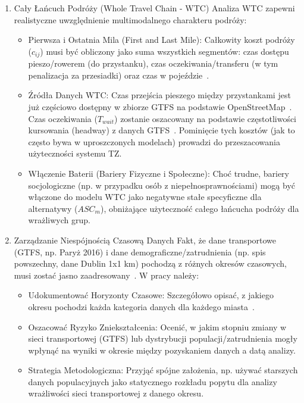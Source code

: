 \documentclass[12pt]{article}
\begin{document}
\begin{enumerate}
\begin{itemize}
        \item Współczynnik Impedancji oparty o Zamożność ($\beta$): W celu uwzględnienia sprawiedliwości społecznej (Society Mapping), współczynnik zaniku ($\beta$), określający wrażliwość na czas podróży, musi być kalibrowany w oparciu o różnice w zamożności (dochody). Wysoki dochód często koreluje z wyższą wrażliwością na czas (wyższe $\beta$), co wymaga segmentacji demograficznej modelu.
    \end{itemize}
    \item Cały Łańcuch Podróży (Whole Travel Chain - WTC) \newline
    Analiza WTC zapewni realistyczne uwzględnienie multimodalnego charakteru podróży:
    \begin{itemize}
        \item Pierwsza i Ostatnia Mila (First and Last Mile): Całkowity koszt podróży ($c_{ij}$) musi być obliczony jako suma wszystkich segmentów: czas dostępu pieszo/rowerem (do przystanku), czas oczekiwania/transferu (w tym penalizacja za przesiadki) oraz czas w pojeździe~\cite{dziewiec}.
        \item Źródła Danych WTC: Czas przejścia pieszego między przystankami jest już częściowo dostępny w zbiorze GTFS na podstawie OpenStreetMap~\cite{trzydziescipiec}. Czas oczekiwania ($T_{wait}$) zostanie oszacowany na podstawie częstotliwości kursowania (headway) z danych GTFS~\cite{dwadziesciatrzy, szescdziesiatcztery}. Pominięcie tych kosztów (jak to często bywa w uproszczonych modelach) prowadzi do przeszacowania użyteczności systemu TZ.
        \item Włączenie Baterii (Bariery Fizyczne i Społeczne): Choć trudne, bariery socjologiczne (np. w przypadku osób z niepełnosprawnościami) mogą być włączone do modelu WTC jako negatywne stałe specyficzne dla alternatywy ($ASC_m$), obniżające użyteczność całego łańcucha podróży dla wrażliwych grup.
    \end{itemize}
    \item Zarządzanie Niespójnością Czasową Danych \newline
    Fakt, że dane transportowe (GTFS, np. Paryż 2016) i dane demograficzne/zatrudnienia (np. spis powszechny, dane Dublin 1x1 km) pochodzą z różnych okresów czasowych, musi zostać jasno zaadresowany~\cite{dwanascie}. W pracy należy:
    \begin{itemize}
        \item Udokumentować Horyzonty Czasowe: Szczegółowo opisać, z jakiego okresu pochodzi każda kategoria danych dla każdego miasta~\cite{trzydziescipiec}.
        \item Oszacować Ryzyko Zniekształcenia: Ocenić, w jakim stopniu zmiany w sieci transportowej (GTFS) lub dystrybucji populacji/zatrudnienia mogły wpłynąć na wyniki w okresie między pozyskaniem danych a datą analizy.
        \item Strategia Metodologiczna: Przyjąć spójne założenia, np. używać starszych danych populacyjnych jako statycznego rozkładu popytu dla analizy wrażliwości sieci transportowej z danego okresu.
    \end{itemize}
\end{enumerate}
\end{document}
